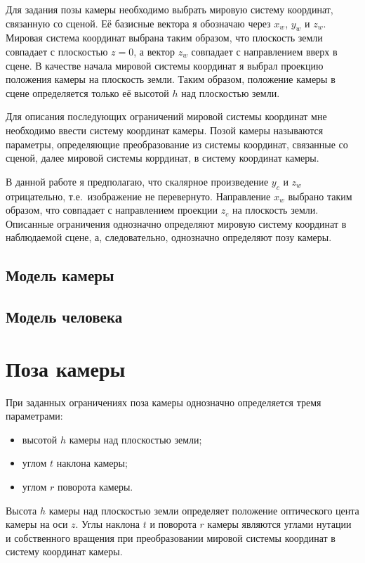 Для задания позы камеры необходимо выбрать мировую систему координат, связанную со сценой. Её базисные вектора я обозначаю через $x_w$, $y_w$ и $z_w$. Мировая система координат выбрана таким образом, что плоскость земли совпадает с плоскостью $z=0$, а вектор $z_w$ совпадает с направлением вверх в сцене. В качестве начала мировой системы координат я выбрал проекцию положения камеры на плоскость земли. Таким образом, положение камеры в сцене определяется только её высотой $h$ над плоскостью земли.

Для описания последующих ограничений мировой системы координат мне необходимо ввести систему координат камеры. Позой камеры называются параметры, определяющие преобразование из системы координат, связанные со сценой, далее мировой системы коррдинат, в систему координат камеры.

В данной работе я предполагаю, что скалярное произведение $y_c$ и $z_w$ отрицательно, т.е.~изображение не перевернуто. Направление $x_w$ выбрано таким образом, что совпадает с направлением проекции $z_c$ на плоскость земли.  Описанные ограничения однозначно определяют мировую систему координат в наблюдаемой сцене, а, следовательно, однозначно определяют позу камеры.

\subsection{Модель камеры}


\subsection{Модель человека}
\section{Поза камеры}


При заданных ограничениях поза камеры однозначно определяется тремя параметрами:
\begin{itemize}
	\item высотой $h$ камеры над плоскостью земли;
	\item углом $t$ наклона камеры;
	\item углом $r$ поворота камеры.
\end{itemize}

Высота $h$ камеры над плоскостью земли определяет положение оптического цента камеры на оси $z$. Углы наклона $t$ и поворота $r$ камеры являются углами нутации и собственного вращения при преобразовании мировой системы координат в систему координат камеры.

